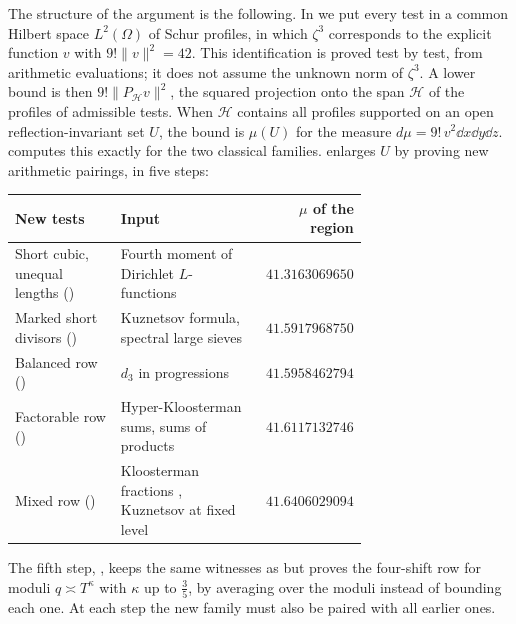 \documentclass[11pt,colorlinks]{charlie}
\newcommand{\Om}{\Omega}
\begin{document}
The structure of the argument is the following. In  we put every test in a common Hilbert space $L^2(\Om)$ of Schur profiles, in which $\zeta^3$ corresponds to the explicit function $v$ with $9!\|v\|^2=42$. This identification is proved test by test, from arithmetic evaluations; it does not assume the unknown norm of $\zeta^3$. A lower bound is then $9!\|P_{\mathcal H}v\|^2$, the squared projection onto the span $\mathcal H$ of the profiles of admissible tests. When $\mathcal H$ contains all profiles supported on an open reflection-invariant set $U$, the bound is $\mu(U)$ for the measure $d\mu=9!\,v^2\dd x\dd y\dd z$.  computes this exactly for the two classical families.  enlarges $U$ by proving new arithmetic pairings, in five steps:
\begin{center}
\small
\begin{tabular}{@{}L{0.30\linewidth}L{0.40\linewidth}r@{}}
\toprule
New tests & Input & $\mu$ of the region \\
\midrule
Short cubic, unequal lengths () & Fourth moment of Dirichlet $L$-functions & $41.3163069650$ \\
Marked short divisors () & Kuznetsov formula, spectral large sieves & $41.5917968750$ \\
Balanced row () & $d_3$ in progressions \cite{HB} & $41.5958462794$ \\
Factorable row () & Hyper-Kloosterman sums, sums of products \cite{FKM} & $41.6117132746$ \\
Mixed row () & Kloosterman fractions \cite{DI}, Kuznetsov at fixed level & $41.6406029094$ \\
\bottomrule
\end{tabular}
\end{center}
The fifth step, , keeps the same witnesses as  but proves the four-shift row for moduli $q\asymp T^\kappa$ with $\kappa$ up to $\frac35$, by averaging over the moduli instead of bounding each one. At each step the new family must also be paired with all earlier ones.
\end{document}
